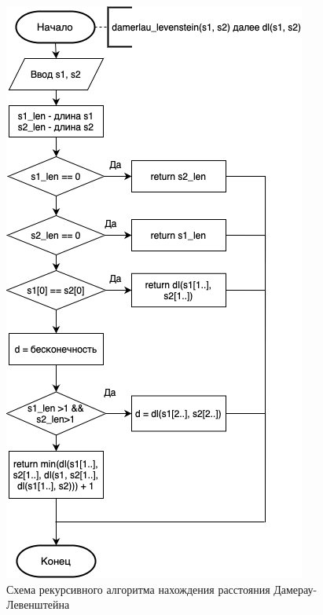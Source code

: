 \documentclass[12pt]{report}
\begin{document}
\begin{figure}[h]
	\centering
	\includegraphics[scale=0.9]{dam_lev_rec.png}
	\caption{Схема рекурсивного алгоритма нахождения расстояния Дамерау-Левенштейна}
	\label{fig:rec_dam_lev}
\end{figure}
\end{document}
